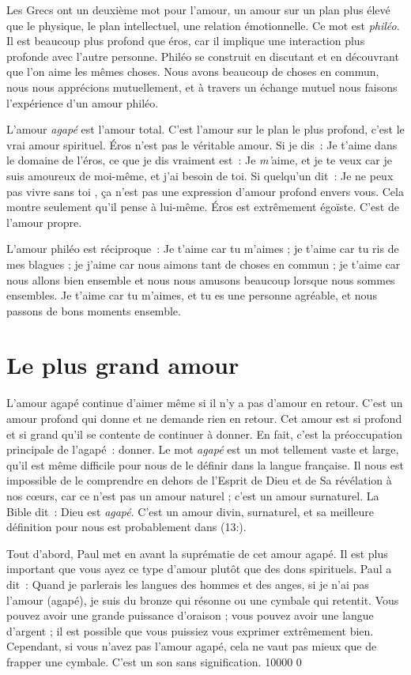 Les Grecs ont un deuxième mot pour l'amour,
 un amour sur un plan plus élevé que le physique, le plan intellectuel,
 une relation émotionnelle. Ce mot est \emph{philéo}.
 Il est beaucoup plus profond que éros, car il implique une interaction
 plus profonde avec l'autre personne.
 Philéo se construit en discutant et en découvrant que l'on aime
 les mêmes choses. Nous avons beaucoup de choses en commun,
 nous nous apprécions mutuellement, et à travers un échange mutuel
 nous faisons l'expérience d'un amour philéo.

L'amour \emph{agapé} est l'amour total.
 C'est l'amour sur le plan le plus profond, c'est le vrai amour spirituel.
 Éros n'est pas le véritable amour. Si je dis~: \og Je t'aime \fg{}
 dans le domaine de l'éros, ce que je dis vraiment est~:
 \og Je \emph{m'}aime, et je te veux car je suis amoureux de moi-même,
 et j'ai besoin de toi. \fg{}
 Si quelqu'un dit~: \og Je ne peux pas vivre sans toi \fg{},
 ça n'est pas une expression d'amour profond envers vous.
 Cela montre seulement qu'il pense à lui-même.
 Éros est extrêmement égoïste. C'est de l'amour propre.

L'amour philéo est réciproque~: \og Je t'aime car tu m'aimes ;
 je t'aime car tu ris de mes blagues ;
 je j'aime car nous aimons tant de choses en commun ;
 je t'aime car nous allons bien ensemble et nous nous amusons beaucoup
 lorsque nous sommes ensembles. Je t'aime car tu m'aimes,
 et tu es une personne agréable, et nous passons de bons moments ensemble. \fg{}


\section{Le plus grand amour}

L'amour agapé continue d'aimer même si il n'y a pas d'amour en retour.
 C'est un amour profond qui donne et ne demande rien en retour.
 Cet amour est si profond et si grand qu'il se contente
 de continuer à donner.
 En fait, c'est la préoccupation principale de l'agapé~: donner.
 Le mot \emph{agapé} est un mot tellement vaste et large,
 qu'il est même difficile pour nous de le définir dans la langue française.
 Il nous est impossible de le comprendre en dehors de l'Esprit de Dieu
 et de Sa révélation à nos cœurs, car ce n'est pas un amour naturel ;
 c'est un amour surnaturel.
 La Bible dit~: \og Dieu est \emph{agapé}. \fg{}
 C'est un amour divin, surnaturel, et sa meilleure définition pour nous
 est probablement dans (13:).

Tout d'abord, Paul met en avant la suprématie de cet amour agapé.
 Il est plus important que vous ayez ce type d'amour
 plutôt que des dons spirituels. Paul a dit~:
 \og Quand je parlerais les langues des hom\-mes et des anges,
 si je n'ai pas l'amour (agapé), je suis du bronze qui résonne
 ou une cymbale qui retentit. \fg{}
 Vous pouvez avoir une grande puissance d'oraison ;
 vous pouvez avoir une langue d'argent ;
 il est possible que vous puissiez vous exprimer extrêmement bien.
 Cependant, si vous n'avez pas l'amour agapé, cela ne vaut pas mieux
 que de frapper une cymbale. C'est un son sans signification.
 \begingroup{} 10000 0
 \par\endgroup

